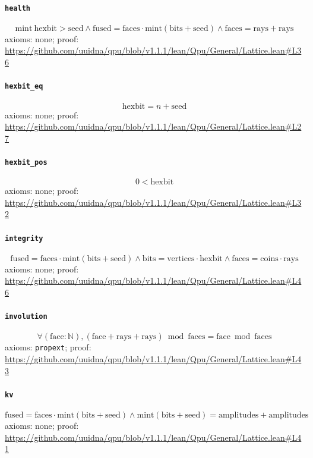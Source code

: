 \documentclass[11pt]{article}
\begin{document}
\paragraph{\texttt{health}}
\[ \mathrm{mint}\ \mathrm{hexbit} > \mathrm{seed} \land \mathrm{fused} = \mathrm{faces} \cdot \mathrm{mint} (\mathrm{bits} + \mathrm{seed}) \land \mathrm{faces} = \mathrm{rays} + \mathrm{rays} \]
\noindent axioms: none; proof: \url{https://github.com/uuidna/qpu/blob/v1.1.1/lean/Qpu/General/Lattice.lean\#L36}

\paragraph{\texttt{hexbit\_eq}}
\[ \mathrm{hexbit} = n + \mathrm{seed} \]
\noindent axioms: none; proof: \url{https://github.com/uuidna/qpu/blob/v1.1.1/lean/Qpu/General/Lattice.lean\#L27}

\paragraph{\texttt{hexbit\_pos}}
\[ 0 < \mathrm{hexbit} \]
\noindent axioms: none; proof: \url{https://github.com/uuidna/qpu/blob/v1.1.1/lean/Qpu/General/Lattice.lean\#L32}

\paragraph{\texttt{integrity}}
\[ \mathrm{fused} = \mathrm{faces} \cdot \mathrm{mint} (\mathrm{bits} + \mathrm{seed}) \land \mathrm{bits} = \mathrm{vertices} \cdot \mathrm{hexbit} \land \mathrm{faces} = \mathrm{coins} \cdot \mathrm{rays} \]
\noindent axioms: none; proof: \url{https://github.com/uuidna/qpu/blob/v1.1.1/lean/Qpu/General/Lattice.lean\#L46}

\paragraph{\texttt{involution}}
\[ \forall (\mathrm{face} : \mathbb{N}), (\mathrm{face} + \mathrm{rays} + \mathrm{rays}) \bmod \mathrm{faces} = \mathrm{face} \bmod \mathrm{faces} \]
\noindent axioms: \texttt{propext}; proof: \url{https://github.com/uuidna/qpu/blob/v1.1.1/lean/Qpu/General/Lattice.lean\#L43}

\paragraph{\texttt{kv}}
\[ \mathrm{fused} = \mathrm{faces} \cdot \mathrm{mint} (\mathrm{bits} + \mathrm{seed}) \land \mathrm{mint} (\mathrm{bits} + \mathrm{seed}) = \mathrm{amplitudes} + \mathrm{amplitudes} \]
\noindent axioms: none; proof: \url{https://github.com/uuidna/qpu/blob/v1.1.1/lean/Qpu/General/Lattice.lean\#L41}
\end{document}
